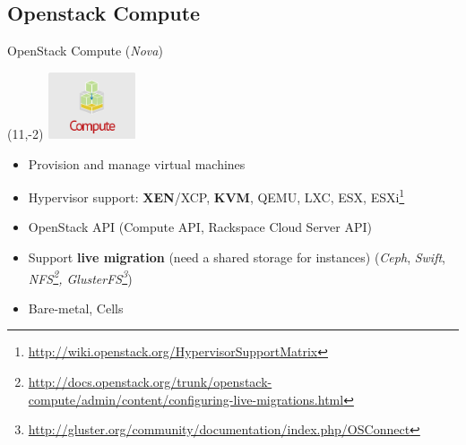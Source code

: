 \subsection{Openstack Compute}
\begin{frame}{OpenStack Compute (\textsl{Nova})}
  \begin{textblock}{}(11,-2)
    \includegraphics[width=7em]{img/compute}
  \end{textblock}
  \begin{itemize}
    \item Provision and manage virtual machines
      \medskip
    \item Hypervisor support: \textbf{XEN}/XCP, \textbf{KVM}, QEMU, LXC, ESX, ESXi\footnote{\url{http://wiki.openstack.org/HypervisorSupportMatrix}}
      \medskip
    \item OpenStack API (Compute API, Rackspace Cloud Server API)
      \medskip
    \item Support \textbf{live migration} (need a shared storage for instances) (\textsl{Ceph}, \textsl{Swift}, \textsl{NFS\footnote{\tiny{\url{http://docs.openstack.org/trunk/openstack-compute/admin/content/configuring-live-migrations.html}}}, GlusterFS\footnote{\tiny{\url{http://gluster.org/community/documentation/index.php/OSConnect}}}})
      \medskip
    \item Bare-metal, Cells
  \end{itemize}
\end{frame}
